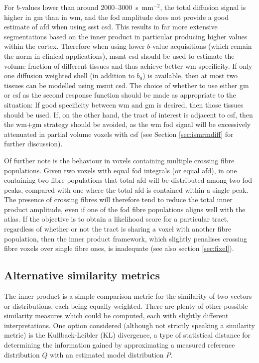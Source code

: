 For $b$-values lower than around 2000--3000~s~mm$^{-2}$, the total diffusion signal is higher in \gls{gm} than in \gls{wm}, and the \gls{fod} amplitude does not provide a good estimate of \gls{afd} when using \gls{ssst} \gls{csd}.
This results in far more extensive segmentations based on the inner product in particular producing higher values within the cortex.
Therefore when using lower $b$-value acquisitions (which remain the norm in clinical applications), \gls{msmt} \gls{csd} should be used to estimate the volume fraction of different tissues and thus achieve better \gls{wm} specificity.
If only one diffusion weighted shell (in addition to $b_0$) is available, then at most two tissues can be modelled using \gls{msmt} \gls{csd}.
The choice of whether to use either \gls{gm} or \gls{csf} as the second response function should be made as appropriate to the situation: If good specificity between \gls{wm} and \gls{gm} is desired, then those tissues should be used.
If, on the other hand, the tract of interest is adjacent to \gls{csf}, then the \gls{wm}+\gls{gm} strategy should be avoided, as the \gls{wm} \gls{fod} signal will be excessively attenuated in partial volume voxels with \gls{csf} (see Section \ref{sec:ismrmdiff} for further discussion).

Of further note is the behaviour in voxels containing multiple crossing fibre populations.
Given two voxels with equal \gls{fod} integrals (or equal \gls{afd}), in one containing two fibre populations that total \gls{afd} will be distributed among two \gls{fod} peaks, compared with one where the total \gls{afd} is contained within a single peak.
The presence of crossing fibres will therefore tend to reduce the total inner product amplitude, even if one of the \gls{fod} fibre populations aligns well with the atlas.
If the objective is to obtain a likelihood score for a particular tract, regardless of whether or not the tract is sharing a voxel with another fibre population, then the inner product framework, which slightly penalises crossing fibre voxels over single fibre ones, is inadequate (see also section \ref{sec:fixel}). %

\subsection{Alternative similarity metrics}

The inner product is a simple comparison metric for the similarity of two vectors or distributions, each being equally weighted.
There are plenty of other possible similarity measures which could be computed, each with slightly different interpretations.
One option considered (although not strictly speaking a similarity metric) is the Kullback-Leibler (KL) divergence, a type of statistical distance for determining the information gained by approximating a measured reference distribution $Q$ with an estimated model distribution $P$.

